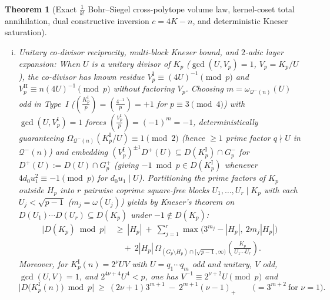\documentclass[11pt, a4paper]{article}
\theoremstyle{plain}
\newtheorem{theorem}{Theorem}[section]
\theoremstyle{definition}
\newcommand{\leg}[2]{\left(\frac{#1}{#2}\right)}
\begin{document}
\begin{theorem}[Exact $\frac{1}{k!}$ Bohr--Siegel cross-polytope volume law, kernel-coset total annihilation, dual constructive inversion $c=4K-n$, and deterministic Kneser saturation]
\begin{enumerate}[(a)]
\begin{enumerate}[(i)]
        \item \emph{Unitary co-divisor reciprocity, multi-block Kneser bound, and $2$-adic layer expansion:} When $U$ is a unitary divisor of $K_p$ ($\gcd(U,V_p)=1$, $V_p=K_p/U$), the co-divisor has known residue $V_p^{\mathrm{I}}\equiv(4U)^{-1}\pmod p$ and $V_p^{\mathrm{II}}\equiv n(4U)^{-1}\pmod p$ without factoring $V_p$. Choosing $m=\omega_{\mathcal{Q}^{-}(n)}(U)$ odd in Type~I ($\leg{K_p^{\mathrm{I}}}{p}=\leg{4^{-1}}{p}=+1$ for $p\equiv3\pmod 4$) with $\gcd(U,V_p^{\mathrm{I}})=1$ forces $\leg{V_p^{\mathrm{I}}}{p}=(-1)^{m}=-1$, deterministically guaranteeing $\Omega_{\mathcal{Q}^{-}(n)}(K_p^{\mathrm{I}}/U)\equiv1\pmod 2$ (hence $\ge1$ prime factor $q\nmid U$ in $\mathcal{Q}^{-}(n)$) and embedding $(V_p^{\mathrm{I}})^{\pm1}D^{+}(U)\subseteq D(K_p^{\mathrm{I}})\cap G_p^{-}$ for $D^{+}(U):=D(U)\cap G_p^{+}$ (giving $-1\bmod p\in D(K_p^{\mathrm{I}})$ whenever $4d_0 u_1^{2}\equiv-1\pmod p$ for $d_0 u_1\mid U$). Partitioning the prime factors of $K_p$ outside $H_p$ into $r$ pairwise coprime square-free blocks $U_1,\dots,U_r\mid K_p$ with each $U_j<\sqrt{p-1}$ ($m_j=\omega(U_j)$) yields by Kneser's theorem on $D(U_1)\cdots D(U_r)\subseteq D(K_p)$ under $-1\notin D(K_p)$:
        \begin{equation}\label{eq:multiblock_kneser_farey_thue}
        \begin{split}
        \big|D(K_p)\bmod p\big|\ &\ge\ |H_p|\ +\ \sum_{j=1}^{r}\max\!\Big(3^{m_j}-|H_p|,\ 2m_j|H_p|\Big)\\
        &\quad +\ 2|H_p|\,\Omega_{(G_p\setminus H_p)\cap[\sqrt{p-1},\infty)}\!\left(\frac{K_p}{U_1\cdots U_r}\right).
        \end{split}
        \end{equation}
        Moreover, for $K_p^{\mathrm{I}}(n)=2^{\nu}UV$ with $U=q_1\cdots q_m$ odd and unitary, $V$ odd, $\gcd(U,V)=1$, and $2^{4\nu+4}U^{4}<p$, one has $V^{-1}\equiv 2^{\nu+2}U\pmod p$ and
        \[
        \big|D\big(K_p^{\mathrm{I}}(n)\big)\bmod p\big|\ \ge\ (2\nu+1)3^{m+1}\ -\ 2^{m+1}(\nu-1)_+\qquad \big(=3^{m+2}\ \text{for }\nu=1\big).
        \]


\end{enumerate}
\end{enumerate}
\end{theorem}
\end{document}
